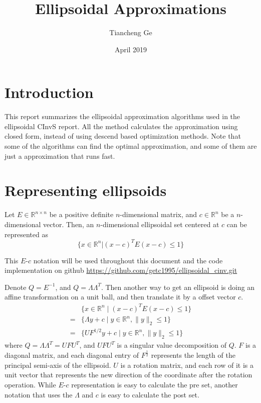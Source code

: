 \documentclass{article}
\title{Ellipsoidal Approximations}
\author{Tiancheng Ge}
\date{April 2019}
\begin{document}
\maketitle
\section*{Introduction}
This report summarizes the ellipsoidal approximation algorithms used in the ellipsoidal CInvS report. All the method calculates the approximation using closed form, instead of using descend based optimization methods. Note that some of the algorithms can find the optimal approximation, and some of them are just a approximation that runs fast.

\tableofcontents

\section{Representing ellipsoids}
Let $E \in \mathbb{R}^{n\times n}$ be a positive definite $n$-dimensional matrix, and $c \in \mathbb{R}^{n}$ be a $n$-dimensional vector. Then, an $n$-dimensional ellipsoidal set centered at $c$ can be represented as 
$$
\{x \in \mathbb{R}^{n} | (x-c)^T E (x-c)\leq 1 \}
$$

This $E$-$c$ notation will be used throughout this document and the code implementation on github
\href{https://github.com/getc1995/ellipsoidal_cinv.git}{https://github.com/getc1995/ellipsoidal\_cinv.git}

Denote $Q = E^{-1}$, and $Q = \Lambda \Lambda^T$. Then another way to get an ellipsoid is doing an affine transformation on a unit ball, and then translate it by a offset vector $c$.
\begin{align*}
&\{x \in \mathbb{R}^{n}\; |\; (x-c)^T E (x-c)\leq 1 \}\\
=& \{ \Lambda y + c \;|\; y \in \mathbb{R}^{n}, \|y\|_2 \leq 1 \}\\
=& \{ U F^{1/2}y + c \;|\; y \in \mathbb{R}^{n}, \|y\|_2 \leq 1 \}
\end{align*}
where $Q = \Lambda \Lambda^T = U F U^T$, and $U F U^T$ is a singular value decomposition of $Q$. $F$ is a diagonal matrix, and each diagonal entry of $F^{\frac{1}{2}}$ represents the length of the principal semi-axis of the ellipsoid. $U$ is a rotation matrix, and each row of it is a unit vector that represents the new direction of the coordinate after the rotation operation. While $E$-$c$ representation is easy to calculate the pre set, another notation that uses the $\Lambda$ and $c$ is easy to calculate the post set.
\end{document}
